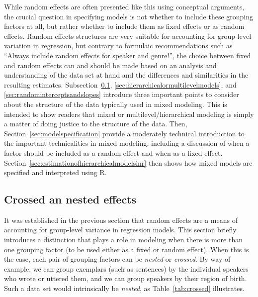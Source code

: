 \documentclass[a4paper,12pt]{article}
\begin{document}
While random effects are often presented like this using conceptual arguments, the crucial question in specifying models is not whether to include these grouping factors at all, but rather whether to include them as fixed effects or as random effects.
Random effects structures are very suitable for accounting for group-level variation in regression, but contrary to formulaic recommendations such as ``Always include random effects for speaker and genre!'', the choice between fixed and random effects can and should be made based on an analysis and understanding of the data set at hand and the differences and similarities in the resulting estimates.
Subsection~\ref{sec:crossedandnestedeffects}, \ref{sec:hierarchicalormultilevelmodels}, and \ref{sec:randominterceptsandslopes} introduce three important points to consider about the structure of the data typically used in mixed modeling.
This is intended to show readers that mixed or multilevel\slash hierarchical modeling is simply a matter of doing justice to the structure of the data.
Then, Section~\ref{sec:modelspecification} provide a moderately technical introduction to the important technicalities in mixed modeling, including a discussion of when a factor should be included as a random effect and when as a fixed effect.
Section~\ref{sec:estimationofhierarchicalmodelsinr} then shows how mixed models are specified and interpreted using R.


\subsection{Crossed an nested effects}
\label{sec:crossedandnestedeffects}

It was established in the previous section that random effects are a means of accounting for group-level variance in regression models.
This section briefly introduces a distinction that plays a role in modeling when there is more than one grouping factor (to be used either as a fixed or random effect).
When this is the case, each pair of grouping factors can be \textit{nested} or \textit{crossed}.
By way of example, we can group exemplars (such as sentences) by the individual speakers who wrote or uttered them, and we can group speakers by their region of birth.
Such a data set would intrinsically be \textit{nested}, as Table~\ref{tab:crossed} illustrates.
\end{document}
